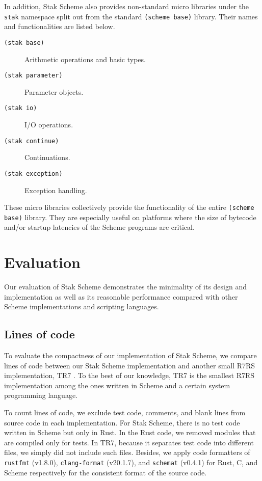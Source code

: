 \documentclass[sigplan, anonymous, review]{acmart}
\begin{document}
In addition, Stak Scheme also provides non-standard micro libraries under
the \texttt{stak} namespace split out from the standard \texttt{(scheme base)}
library.
Their names and functionalities are listed below.

\begin{description}
  \item[\texttt{(stak base)}] Arithmetic operations and basic types.
  \item[\texttt{(stak parameter)}] Parameter objects.
  \item[\texttt{(stak io)}] I/O operations.
  \item[\texttt{(stak continue)}] Continuations.
  \item[\texttt{(stak exception)}] Exception handling.
\end{description}

These micro libraries collectively provide the functionality of the entire
\texttt{(scheme base)} library.
They are especially useful on platforms where the size of bytecode
and/or startup latencies of the Scheme programs are critical.

\section{Evaluation} \label{evaluation}

Our evaluation of Stak Scheme demonstrates the minimality of its design and
implementation as well as its reasonable performance compared with
other Scheme implementations and scripting languages.

\subsection{Lines of code}

To evaluate the compactness of our implementation of Stak Scheme,
we compare lines of code between our Stak Scheme implementation and
another small R7RS implementation, TR7 \cite{tr7}.
To the best of our knowledge, TR7 is the smallest R7RS implementation
among the ones written in Scheme and a certain system programming language.

To count lines of code, we exclude test code, comments, and blank
lines from source code in each implementation.
For Stak Scheme, there is no test code written in Scheme but only in Rust.
In the Rust code, we removed modules that are compiled only for tests.
In TR7, because it separates test code into different files, we simply did not
include such files.
Besides, we apply code formatters of \texttt{rustfmt} (v1.8.0),
\texttt{clang-format} (v20.1.7), and \texttt{schemat} (v0.4.1) for
Rust, C, and Scheme respectively for the consistent format of the source code.
\end{document}
